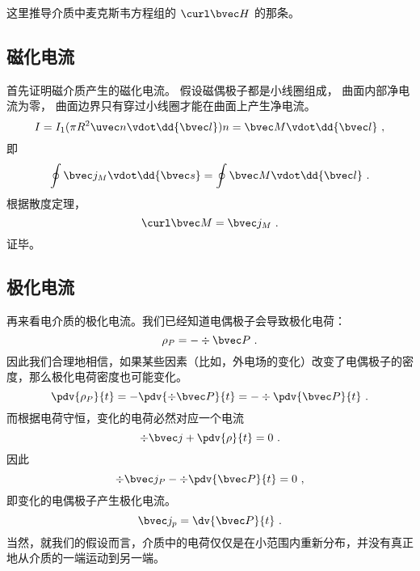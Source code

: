 


这里推导介质中麦克斯韦方程组的 $\curl \bvec H$ 的那条。

\subsection{磁化电流}
首先证明磁介质产生的磁化电流。 假设磁偶极子都是小线圈组成， 曲面内部净电流为零， 曲面边界只有穿过小线圈才能在曲面上产生净电流。
\begin{equation}
I = I_1 (\pi R^2 \uvec n \vdot \dd{\bvec l}) n = \bvec M \vdot \dd{\bvec l}~,
\end{equation}
即
\begin{equation}
\oint \bvec j_M \vdot \dd{\bvec s} = \oint \bvec M \vdot \dd{\bvec l}~.
\end{equation}
根据散度定理，
\begin{equation}
\curl \bvec M = \bvec j_M~.
\end{equation}
证毕。

\subsection{极化电流}
再来看电介质的极化电流。我们已经知道电偶极子会导致极化电荷：
$$\rho_P=-\div \bvec P~.$$
因此我们合理地相信，如果某些因素（比如，外电场的变化）改变了电偶极子的密度，那么极化电荷密度也可能变化。
$$\pdv{\rho_P}{t}=-\pdv{\div \bvec P}{t}=-\div \pdv{\bvec P}{t}~.$$
而根据电荷守恒，变化的电荷必然对应一个电流
$$\div \bvec j + \pdv{\rho}{t}=0~.$$
因此
$$
\div \bvec j_P -\div \pdv{\bvec P}{t}=0~,
$$
即变化的电偶极子产生极化电流。
\begin{equation}
\bvec j_p = \dv{\bvec P}{t}~.
\end{equation}
当然，就我们的假设而言，介质中的电荷仅仅是在小范围内重新分布，并没有真正地从介质的一端运动到另一端。

